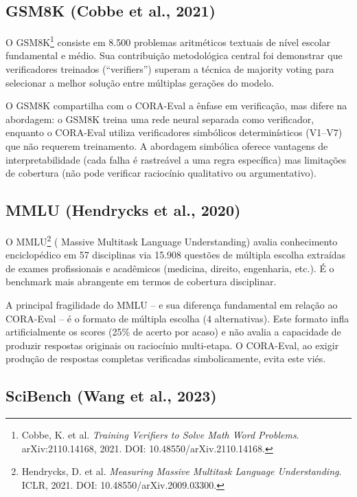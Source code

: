 \subsection{GSM8K (Cobbe et al., 2021)}

O GSM8K\footnote{Cobbe, K. et al. \textit{Training Verifiers to Solve
Math Word Problems}. arXiv:2110.14168, 2021. DOI:
10.48550/arXiv.2110.14168.} consiste em 8.500 problemas aritméticos
textuais de nível escolar fundamental e médio. Sua contribuição
metodológica central foi demonstrar que verificadores treinados
(``verifiers'') superam a técnica de majority voting para selecionar a
melhor solução entre múltiplas gerações do modelo.

O GSM8K compartilha com o CORA-Eval a ênfase em verificação, mas difere
na abordagem: o GSM8K treina uma rede neural separada como verificador,
enquanto o CORA-Eval utiliza verificadores simbólicos determinísticos
(V1--V7) que não requerem treinamento. A abordagem simbólica oferece
vantagens de interpretabilidade (cada falha é rastreável a uma regra
específica) mas limitações de cobertura (não pode verificar raciocínio
qualitativo ou argumentativo).

\subsection{MMLU (Hendrycks et al., 2020)}

O MMLU\footnote{Hendrycks, D. et al. \textit{Measuring Massive Multitask
Language Understanding}. ICLR, 2021. DOI: 10.48550/arXiv.2009.03300.}
( Massive Multitask Language Understanding) avalia conhecimento
enciclopédico em 57 disciplinas via 15.908 questões de múltipla escolha
extraídas de exames profissionais e acadêmicos (medicina, direito,
engenharia, etc.). É o benchmark mais abrangente em termos de cobertura
disciplinar.

A principal fragilidade do MMLU -- e sua diferença fundamental em relação
ao CORA-Eval -- é o formato de múltipla escolha (4 alternativas). Este
formato infla artificialmente os scores (25\% de acerto por acaso) e não
avalia a capacidade de produzir respostas originais ou raciocínio
multi-etapa. O CORA-Eval, ao exigir produção de respostas completas
verificadas simbolicamente, evita este viés.

\subsection{SciBench (Wang et al., 2023)}

